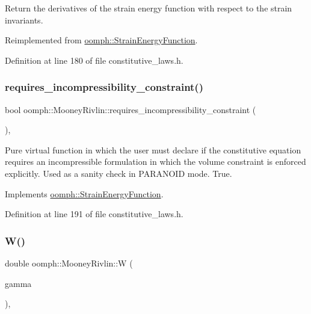 Return the derivatives of the strain energy function with respect to the strain invariants. 



Reimplemented from \hyperlink{classoomph_1_1StrainEnergyFunction_a81ca7bb14cce217ffac9d308dba39756}{oomph\+::\+Strain\+Energy\+Function}.



Definition at line 180 of file constitutive\+\_\+laws.\+h.

\mbox{\label{classoomph_1_1MooneyRivlin_ad5cd489e1bc8f4cfe1f147135ffe21af}} 
\subsubsection{\texorpdfstring{requires\+\_\+incompressibility\+\_\+constraint()}{requires\_incompressibility\_constraint()}}
{\footnotesize\ttfamily bool oomph\+::\+Mooney\+Rivlin\+::requires\+\_\+incompressibility\+\_\+constraint (\begin{DoxyParamCaption}{ }\end{DoxyParamCaption})\hspace{0.3cm}{\ttfamily [inline]}, {\ttfamily [virtual]}}



Pure virtual function in which the user must declare if the constitutive equation requires an incompressible formulation in which the volume constraint is enforced explicitly. Used as a sanity check in P\+A\+R\+A\+N\+O\+ID mode. True. 



Implements \hyperlink{classoomph_1_1StrainEnergyFunction_a312fe03c070f5c45a99ae4e186936147}{oomph\+::\+Strain\+Energy\+Function}.



Definition at line 191 of file constitutive\+\_\+laws.\+h.

\mbox{\label{classoomph_1_1MooneyRivlin_a9411c5fbb920d071e83a9e52fb8b60d1}} 
\subsubsection{\texorpdfstring{W()}{W()}\hspace{0.1cm}{\footnotesize\ttfamily [1/2]}}
{\footnotesize\ttfamily double oomph\+::\+Mooney\+Rivlin\+::W (\begin{DoxyParamCaption}\item[{const \hyperlink{classoomph_1_1DenseMatrix}{Dense\+Matrix}$<$ double $>$ \&}]{gamma }\end{DoxyParamCaption})\hspace{0.3cm}{\ttfamily [inline]}, {\ttfamily [virtual]}}



